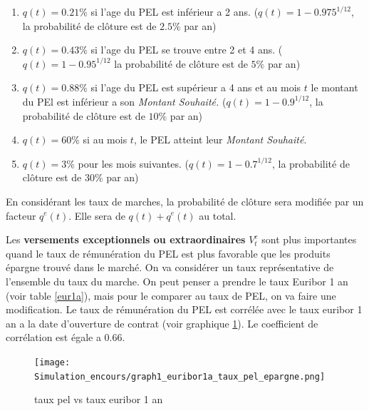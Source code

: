 \documentclass[12pt, a4paper]{book}
\begin{document}
\medskip

\begin{enumerate}
\item $q(t)=0.21\%$ si l'age du PEL est inférieur a 2 ans. ($q(t) = 1 - 0.975 ^ {1/12}$, la probabilité de clôture  est de $2.5\%$ par an)

\medskip


\item $q(t)=0.43\%$ si l'age du PEL se trouve entre 2 et 4 ans. ($q(t) = 1 - 0.95 ^ {1/12}$ la probabilité de clôture  est de $5\%$ par an)
\medskip

\item $q(t)=0.88\%$ si l'age du PEL est supérieur a 4 ans et au mois $t$ le montant du PEl est inférieur a son {\it Montant Souhaité.} ($q(t) = 1 - 0.9 ^ {1/12}$, la probabilité de clôture  est de $10\%$ par an)

\medskip

\item $q(t)=60\%$ si au mois $t$, le PEL atteint leur {\it Montant Souhaité}.

\medskip

\item $q(t)=3\%$ pour les mois suivantes. ($q(t) = 1 - 0.7 ^ {1/12}$, la probabilité de clôture  est de $30\%$ par an)
\end{enumerate}

\medskip

En considérant  les taux de marches, la probabilité de clôture sera modifiée par un facteur $q^e(t)$. Elle sera de $q(t)+q^e(t)$ au total.

\bigskip

Les {\bf versements exceptionnels ou extraordinaires} $V_t^e$  sont plus importantes quand le taux de rémunération du PEL     est plus favorable que les produits épargne trouvé dans le marché. On va considérer un taux représentative de l'ensemble du taux du marche. On peut penser a prendre le taux Euribor 1 an (voir table \ref{eur1a}), mais pour le comparer au taux de PEL, on va faire une modification. Le taux de rémunération du PEL est corrélée avec le taux euribor 1 an a la date d'ouverture de contrat (voir graphique \ref{pelvseuribor}). Le coefficient de corrélation est égale a 0.66. 


\begin{figure}[hbtp]
\label{pelvseuribor}
\centering
\texttt{[image: Simulation\_encours/graph1\_euribor1a\_taux\_pel\_epargne.png]}
\caption{taux pel vs taux euribor 1 an }
\end{figure}
\end{document}
